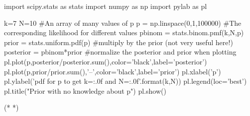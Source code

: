 \begin{python}[caption = Posterior probability for a coin toss]
import scipy.stats as stats
import numpy as np
import pylab as pl

k=7
N=10
#An array of many values of p
p = np.linspace(0,1,100000)
#The corresponding likelihood for different values
pbinom = stats.binom.pmf(k,N,p)
prior = stats.uniform.pdf(p)
#multiply by the prior (not very useful here!)
posterior = pbinom*prior
#normalize the posterior and prior when plotting
pl.plot(p,posterior/posterior.sum(),color='black',label='posterior')
pl.plot(p,prior/prior.sum(),'--',color='black',label='prior')
pl.xlabel('p')
pl.ylabel('pdf for p to get k={:.0f} and N={:.0f}'.format(k,N))
pl.legend(loc='best')
pl.title("Prior with no knowledge about p")
pl.show()
\end{python}
\begin{poutput}
(*  *)
\end{poutput}

